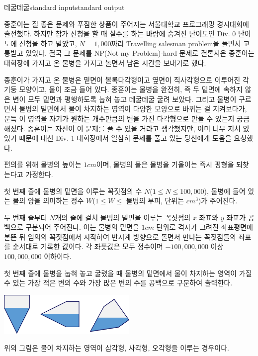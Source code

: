 \begin{problem}{데굴데굴}{standard input}{standard output}

종훈이는 질 좋은 문제와 푸짐한 상품이 주어지는 서울대학교 프로그래밍 경시대회에 출전했다. 하지만 참가 신청을 할 때 실수를 하는 바람에 숨겨진 난이도인 Div. 0 난이도에 신청을 하고 말았고, $N = 1,000$짜리 Travelling salesman problem을 풀면서 고통받고 있었다. 결국 그 문제를 NP(Not my Problem)-hard 문제로 결론지은 종훈이는 대회장에 가지고 온 물병을 가지고 놀면서 남은 시간을 보내기로 했다.

종훈이가 가지고 온 물병은 밑면이 볼록다각형이고 옆면이 직사각형으로 이루어진 각기둥 모양이고, 물이 조금 들어 있다. 종훈이는 물병을 완전히, 즉 두 밑면에 속하지 않은 변이 모두 밑면과 평행하도록 눕혀 놓고 데굴데굴 굴려 보았다. 그리고 물병이 구르면서 물병의 밑면에서 물이 차지하는 영역이 다양한 모양으로 바뀌는 걸 지켜보다가, 문득 이 영역을 자기가 원하는 개수만큼의 변을 가진 다각형으로 만들 수 있는지 궁금해졌다. 종훈이는 자신이 이 문제를 풀 수 있을 거라고 생각했지만, 이미 너무 지쳐 있었기 때문에 대신 Div. 1 대회장에서 열심히 문제를 풀고 있는 당신에게 도움을 요청했다.

편의를 위해 물병의 높이는 $1cm$이며, 물병의 물은 물병을 기울이는 즉시 평형을 되찾는다고 가정한다.

\InputFile
첫 번째 줄에 물병의 밑면을 이루는 꼭짓점의 수 $N$($1 \le N \le 100,000$), 물병에 들어 있는 물의 양을 의미하는 정수 $W$($1 \le W \le$ 물병의 부피, 단위는 $cm^{3}$)가 주어진다.

두 번째 줄부터 $N$개의 줄에 걸쳐 물병의 밑면을 이루는 꼭짓점의 $x$ 좌표와 $y$ 좌표가 공백으로 구분되어 주어진다. 이는 물병의 밑면을 $1cm$ 단위로 격자가 그려진 좌표평면에 본뜬 뒤 임의의 꼭짓점에서 시작하여 반시계 방향으로 돌면서 만나는 꼭짓점들의 좌표를 순서대로 기록한 값이다. 각 좌푯값은 모두 정수이며 $-100,000,000$ 이상 $100,000,000$ 이하이다.

\OutputFile
첫 번째 줄에 물병을 눕혀 놓고 굴렸을 때 물병의 밑면에서 물이 차지하는 영역이 가질 수 있는 가장 적은 변의 수와 가장 많은 변의 수를 공백으로 구분하여 출력한다.

\Example

\begin{example}
%
\end{example}

\Notes
\begin{center}
  \includegraphics[width=0.5\textwidth]{roll.png}
\end{center}

위의 그림은 물이 차지하는 영역이 삼각형, 사각형, 오각형을 이루는 경우이다.

\end{problem}
